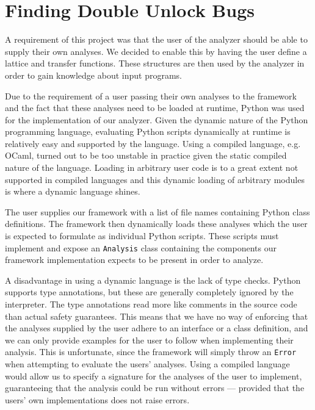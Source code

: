 \section{Finding Double Unlock Bugs}

\newpar A requirement of this project was that the user of the analyzer should be able to supply their own analyses. We decided to enable this by having the user define a lattice and transfer functions. These structures are then used by the analyzer in order to gain knowledge about input programs.

\newpar Due to the requirement of a user passing their own analyses to the framework and the fact that these analyses need to be loaded at runtime, Python was used for the implementation of our analyzer. Given the dynamic nature of the Python programming language, evaluating Python scripts dynamically at runtime is relatively easy and supported by the language. Using a compiled language, e.g. OCaml, turned out to be too unstable in practice given the static compiled nature of the language. Loading in arbitrary user code is to a great extent not supported in compiled languages and this dynamic loading of arbitrary modules is where a dynamic language shines. 

\newpar The user supplies our framework with a list of file names containing Python class definitions. The framework then dynamically loads these analyses which the user is expected to formulate as individual Python scripts. These scripts must implement and expose an \texttt{Analysis} class containing the components our framework implementation expects to be present in order to analyze. 

\newpar A disadvantage in using a dynamic language is the lack of type checks. Python supports type annotations, but these are generally completely ignored by the interpreter. The type annotations read more like comments in the source code than actual safety guarantees. This means that we have no way of enforcing that the analyses supplied by the user adhere to an interface or a class definition, and we can only provide examples for the user to follow when implementing their analysis. This is unfortunate, since the framework will simply throw an \texttt{Error} when attempting to evaluate the users' analyses. Using a compiled language would allow us to specify a signature for the analyses of the user to implement, guaranteeing that the analysis could be run without errors --- provided that the users' own implementations does not raise errors.

